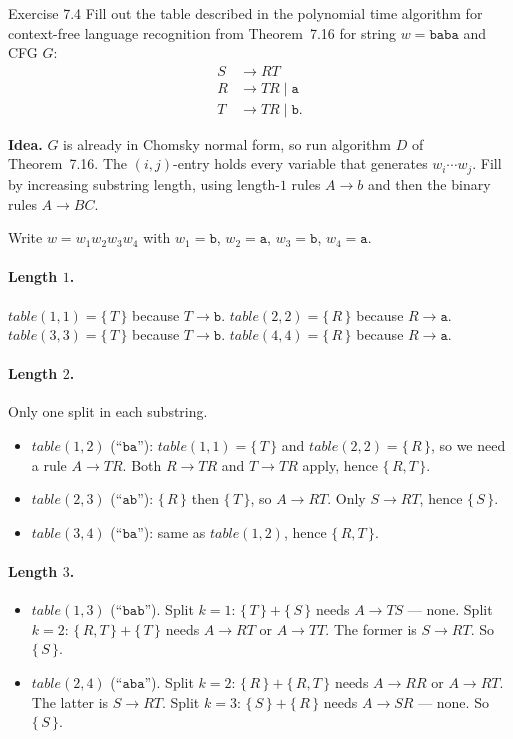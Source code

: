 \begin{question}{Exercise 7.4}
Fill out the table described in the polynomial time algorithm for context-free language recognition from Theorem~7.16 for string $w=\mathtt{baba}$ and CFG $G$:
\[
\begin{aligned}
S &\to RT\\
R &\to TR \mid \mathtt{a}\\
T &\to TR \mid \mathtt{b}.
\end{aligned}
\]
\end{question}
\begin{soln}
\textbf{Idea.} $G$ is already in Chomsky normal form, so run algorithm $D$ of Theorem~7.16. The $(i,j)$-entry holds every variable that generates $w_i\cdots w_j$. Fill by increasing substring length, using length-$1$ rules $A\to b$ and then the binary rules $A\to BC$.

Write $w=w_1w_2w_3w_4$ with $w_1=\mathtt{b}$, $w_2=\mathtt{a}$, $w_3=\mathtt{b}$, $w_4=\mathtt{a}$.

\paragraph{Length $1$.}
$table(1,1)=\{\,T\,\}$ because $T\to\mathtt{b}$.
$table(2,2)=\{\,R\,\}$ because $R\to\mathtt{a}$.
$table(3,3)=\{\,T\,\}$ because $T\to\mathtt{b}$.
$table(4,4)=\{\,R\,\}$ because $R\to\mathtt{a}$.

\paragraph{Length $2$.}
Only one split in each substring.
\begin{itemize}
\item $table(1,2)$ (``$\mathtt{ba}$''): $table(1,1)=\{\,T\,\}$ and $table(2,2)=\{\,R\,\}$, so we need a rule $A\to TR$. Both $R\to TR$ and $T\to TR$ apply, hence $\{\,R,T\,\}$.
\item $table(2,3)$ (``$\mathtt{ab}$''): $\{\,R\,\}$ then $\{\,T\,\}$, so $A\to RT$. Only $S\to RT$, hence $\{\,S\,\}$.
\item $table(3,4)$ (``$\mathtt{ba}$''): same as $table(1,2)$, hence $\{\,R,T\,\}$.
\end{itemize}

\paragraph{Length $3$.}
\begin{itemize}
\item $table(1,3)$ (``$\mathtt{bab}$'').
Split $k=1$: $\{\,T\,\}+\{\,S\,\}$ needs $A\to TS$ --- none.
Split $k=2$: $\{\,R,T\,\}+\{\,T\,\}$ needs $A\to RT$ or $A\to TT$. The former is $S\to RT$. So $\{\,S\,\}$.
\item $table(2,4)$ (``$\mathtt{aba}$'').
Split $k=2$: $\{\,R\,\}+\{\,R,T\,\}$ needs $A\to RR$ or $A\to RT$. The latter is $S\to RT$.
Split $k=3$: $\{\,S\,\}+\{\,R\,\}$ needs $A\to SR$ --- none.
So $\{\,S\,\}$.
\end{itemize}


\end{soln}
